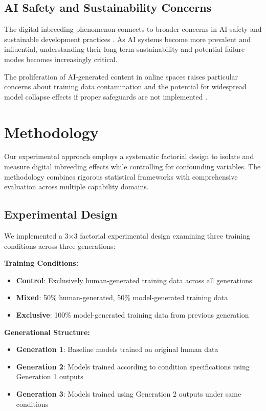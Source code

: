 \documentclass{article}
\begin{document}
\subsection{AI Safety and Sustainability Concerns}

The digital inbreeding phenomenon connects to broader concerns in AI safety and sustainable development practices \citep{amodei2016concrete, russell2019human}. As AI systems become more prevalent and influential, understanding their long-term sustainability and potential failure modes becomes increasingly critical.

The proliferation of AI-generated content in online spaces raises particular concerns about training data contamination and the potential for widespread model collapse effects if proper safeguards are not implemented \citep{solaiman2019release}.

\section{Methodology}

Our experimental approach employs a systematic factorial design to isolate and measure digital inbreeding effects while controlling for confounding variables. The methodology combines rigorous statistical frameworks with comprehensive evaluation across multiple capability domains.

\subsection{Experimental Design}

We implemented a 3×3 factorial experimental design examining three training conditions across three generations:

\textbf{Training Conditions:}
\begin{itemize}
    \item \textbf{Control}: Exclusively human-generated training data across all generations
    \item \textbf{Mixed}: 50\% human-generated, 50\% model-generated training data
    \item \textbf{Exclusive}: 100\% model-generated training data from previous generation
\end{itemize}

\textbf{Generational Structure:}
\begin{itemize}
    \item \textbf{Generation 1}: Baseline models trained on original human data
    \item \textbf{Generation 2}: Models trained according to condition specifications using Generation 1 outputs
    \item \textbf{Generation 3}: Models trained using Generation 2 outputs under same conditions
\end{itemize}
\end{document}
